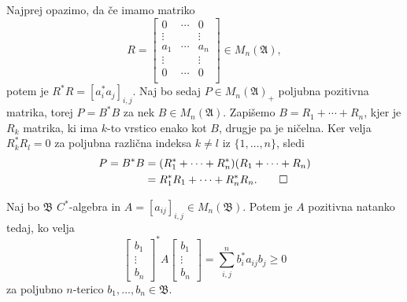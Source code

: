 \begin{dokaz}
    Najprej opazimo, da če imamo matriko $$R = \begin{bmatrix}
        0 & \cdots & 0\\
        \vdots & & \vdots\\
        a_1 & \cdots & a_n\\
        \vdots & & \vdots\\
        0 & \cdots & 0\\       
    \end{bmatrix} \in M_n (\mathfrak{A}),$$
    potem je $R^* R = [a_i^* a_j]_{i, j}$.
    Naj bo sedaj $P \in M_n (\mathfrak{A})_+$ poljubna pozitivna matrika, torej $P = B^* B$ za nek $B \in M_n (\mathfrak{A})$.
    Zapišemo $B = R_1 + \cdots + R_n$, kjer je $R_k$ matrika,
    ki ima $k$-to vrstico enako kot $B$, drugje pa je ničelna.
    Ker velja $R_k^* R_l = 0$ za poljubna različna indeksa $k \neq l$ iz $\{1, \dots, n\}$,
    sledi
    \begin{align*}
        P = B^* B &= (R_1 ^* + \cdots + R_n ^*) (R_1 + \cdots + R_n) \\
        &= R_1 ^* R_1 + \cdots + R_n ^* R_n. \qedhere
    \end{align*}
\end{dokaz}



\begin{lema}\label{lem:1.3}
    Naj bo $\mathfrak{B}$ $C^*$-algebra in $A = [a_{ij}]_{i, j} \in M_n(\mathfrak{B})$.
    Potem je $A$ pozitivna natanko tedaj, ko velja $$\begin{bmatrix}
        b_1 \\ \vdots \\ b_n
    \end{bmatrix}^* A \begin{bmatrix}
        b_1 \\ \vdots \\ b_n
    \end{bmatrix} = \sum_{i, j} ^n b_i ^* a_{ij} b_j \geq 0$$
    za poljubno $n$-terico $b_1, \dots, b_n \in \mathfrak{B}$.
\end{lema}

